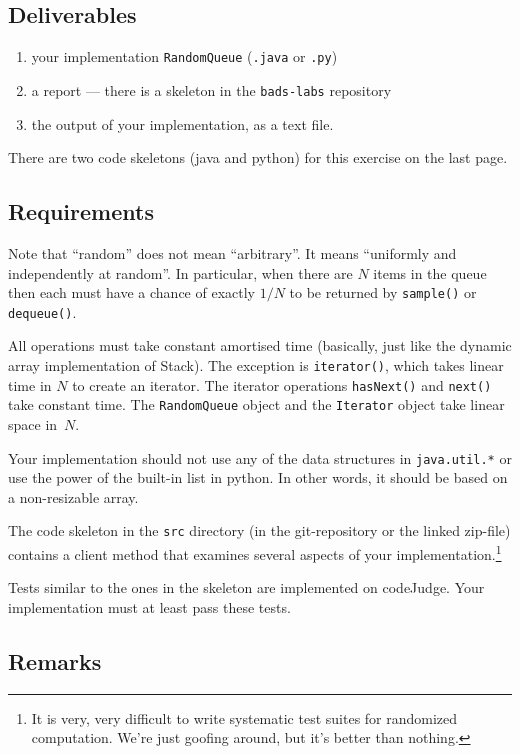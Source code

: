 \documentclass{tufte-handout}
\begin{document}
\subsection{Deliverables}

\begin{enumerate}
\item your implementation {\tt RandomQueue} ({\tt.java} or {\tt.py}) 
\item a report --- there is a skeleton in the \texttt{bads-labs} repository
\item the output of your implementation, as a text file.
\end{enumerate}
There are two code skeletons (java and python) for this exercise on the last page.


\subsection{Requirements}
Note that ``random'' does not mean ``arbitrary''.
It means ``uniformly and independently at random''.
In particular, when there are $N$ items in the queue then each must
have a chance of exactly $1/N$ to be returned by {\tt sample()} or
{\tt dequeue()}.

All operations must take constant amortised time (basically, just like
the dynamic array implementation of Stack).
The exception is {\tt iterator()}, which takes linear time in $N$ to create an iterator.
The iterator operations {\tt hasNext()} and {\tt next()} take constant
time.
The {\tt RandomQueue} object and the {\tt Iterator} object take linear
space in~$N$.

Your implementation should not use any of the data structures in \texttt{java.util.*} or use the power of the built-in list in python. In other words, it should be based on a non-resizable array. 

The code skeleton in the {\tt src} directory (in the git-repository or the linked zip-file) contains a client method
that examines several aspects of your implementation.\footnote{It is very, very difficult to write systematic test suites for
randomized computation. We're just goofing around, but it's better
than nothing.}

Tests similar to the ones in the skeleton are implemented on codeJudge. 
Your implementation must at least pass these tests.

\subsection{Remarks}
\end{document}
